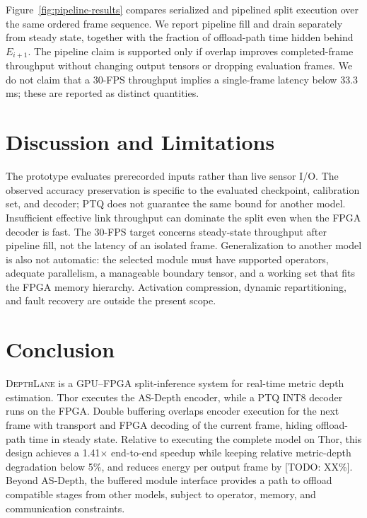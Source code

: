 \documentclass[sigconf]{support/acmart}
\newcommand{\system}{\textsc{DepthLane}}
\newcommand{\todo}[1]{\textcolor{ACMRed}{[TODO: #1]}}
\begin{document}
Figure~\ref{fig:pipeline-results} compares serialized and pipelined split
execution over the same ordered frame sequence.  We report pipeline fill and
drain separately from steady state, together with the fraction of offload-path
time hidden behind $E_{i+1}$.  The pipeline claim is supported only if overlap
improves completed-frame throughput without changing output tensors or dropping
evaluation frames.  We do not claim that a 30-FPS throughput implies a
single-frame latency below 33.3\,ms; these are reported as distinct quantities.

\section{Discussion and Limitations}
\label{sec:limitations}

The prototype evaluates prerecorded inputs rather than live sensor I/O.  The
observed accuracy preservation is specific to the evaluated checkpoint,
calibration set, and decoder; PTQ does not guarantee the same bound for another
model.  Insufficient effective link throughput can dominate the split even when
the FPGA decoder is fast.  The 30-FPS target concerns steady-state throughput
after pipeline fill, not the latency of an isolated frame.  Generalization to
another model is also not automatic: the selected module must have supported
operators, adequate parallelism, a manageable boundary tensor, and a working
set that fits the FPGA memory hierarchy.  Activation compression, dynamic
repartitioning, and fault recovery are outside the present scope.

\section{Conclusion}

\system{} is a GPU--FPGA split-inference system for real-time metric depth
estimation.  Thor executes the AS-Depth encoder, while a PTQ INT8 decoder runs
on the FPGA.  Double buffering overlaps encoder execution for the next frame
with transport and FPGA decoding of the current frame, hiding offload-path time
in steady state.  Relative to executing the complete model on Thor, this design
achieves a 1.41$\times$ end-to-end speedup while keeping relative metric-depth
degradation below 5\%, and reduces energy per output frame by \todo{XX\%}.
Beyond AS-Depth, the buffered module interface provides a path to offload
compatible stages from other models, subject to operator, memory, and
communication constraints.

\clearpage


\end{document}
